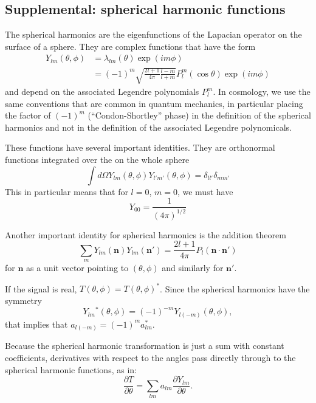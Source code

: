 \begin{subappendices}
\section{Supplemental: spherical harmonic functions}\label{sup:spherical_harmonics}

The spherical harmonics are the eigenfunctions of the Lapacian operator on the surface of a sphere.  They are complex functions that have the form
\begin{align}
  Y_{lm}(\theta,\phi) &= \lambda_{lm}(\theta)  \exp(im\phi)  \\ \nonumber
  &=(-1)^m \sqrt{\frac{2 l + 1}{4\pi} \frac{l-m}{l+m}} P_l^m(\cos \theta) \exp(im\phi)
\end{align}
and depend on the associated Legendre polynomials $P_l^m$.  In cosmology, we use the same conventions that are common in quantum mechanics, in particular placing the factor of $(-1)^m$ (``Condon-Shortley'' phase) in the definition of the spherical harmonics and not in the definition of the associated Legendre polynomicals.

These functions have several important identities.  They are orthonormal functions integrated over the on the whole sphere
\begin{equation}
  \int d\Omega Y_{lm}(\theta,\phi) Y_{l'm'}(\theta,\phi) = \delta_{ll'} \delta_{mm'}
\end{equation}
This in particular means that for $l=0$, $m=0$, we must have
\begin{equation}
  Y_{00} = \frac{1}{(4\pi)^{1/2}}
\end{equation}

Another important identity for spherical harmonics is the addition theorem
\begin{equation}
  \sum_{m} Y_{lm}(\mathbf{n}) Y_{lm}(\mathbf{n}') = \frac{2l+1}{4\pi} P_l(\mathbf{n \cdot n}') \label{eq:addition_theorm}
\end{equation}
for $\mathbf{n}$ as a unit vector pointing to $(\theta,\phi)$ and similarly for $\mathbf{n}'$.

If the signal is real, $T(\theta,\phi) = T(\theta,\phi)^*$.  Since the spherical harmonics have the symmetry
\begin{equation}
Y_{lm}{}^* (\theta, \phi) = (-1)^{-m} Y_{l(-m)} (\theta, \phi),
\end{equation}
that implies that $a_{l(-m)} = (-1)^m a_{lm}^*$.

Because the spherical harmonic transformation is just a sum with constant coefficients, derivatives with respect to the angles pass directly through to the spherical harmonic functions, as in:
\begin{equation}
\frac{\partial T}{\partial \theta} = \sum_{lm} a_{lm} \frac{\partial Y_{lm}}{\partial \theta}.
\end{equation}


\end{subappendices}
